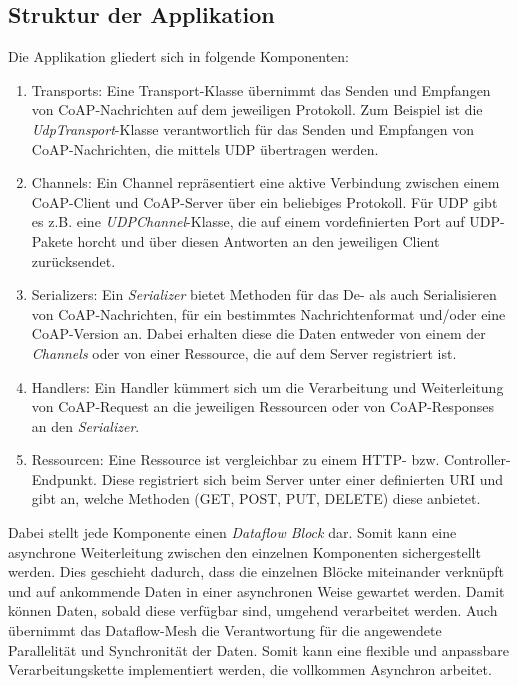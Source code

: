 \subsection{Struktur der Applikation}
\label{subsec:struktur-der-applikation}

Die Applikation gliedert sich in folgende Komponenten:
\begin{enumerate}
    \item Transports: Eine Transport-Klasse übernimmt das Senden und Empfangen von CoAP-Nachrichten auf dem jeweiligen Protokoll. Zum Beispiel ist die \textit{UdpTransport}-Klasse verantwortlich für das Senden und Empfangen von CoAP-Nachrichten, die mittels UDP übertragen werden.
    \item Channels: Ein Channel repräsentiert eine aktive Verbindung zwischen einem CoAP-Client und CoAP-Server über ein beliebiges Protokoll. Für UDP gibt es z.B. eine \textit{UDPChannel}-Klasse, die auf einem vordefinierten Port auf UDP-Pakete horcht und über diesen Antworten an den jeweiligen Client zurücksendet.
    \item Serializers: Ein \textit{Serializer} bietet Methoden für das De- als auch Serialisieren von CoAP-Nachrichten, für ein bestimmtes Nachrichtenformat und/oder eine CoAP-Version an. Dabei erhalten diese die Daten entweder von einem der \textit{Channels} oder von einer Ressource, die auf dem Server registriert ist.
    \item Handlers: Ein Handler kümmert sich um die Verarbeitung und Weiterleitung von CoAP-Request an die jeweiligen Ressourcen oder von CoAP-Responses an den \textit{Serializer}.
    \item Ressourcen: Eine Ressource ist vergleichbar zu einem HTTP- bzw. Controller-Endpunkt. Diese registriert sich beim Server unter einer definierten URI und gibt an, welche Methoden (GET, POST, PUT, DELETE) diese anbietet.
\end{enumerate}

Dabei stellt jede Komponente einen \textit{Dataflow Block} dar. Somit kann eine asynchrone Weiterleitung zwischen den einzelnen Komponenten sichergestellt werden. Dies geschieht dadurch, dass die einzelnen Blöcke miteinander verknüpft und auf ankommende Daten in einer asynchronen Weise gewartet werden. Damit können Daten, sobald diese verfügbar sind, umgehend verarbeitet werden. Auch übernimmt das Dataflow-Mesh die Verantwortung für die angewendete Parallelität und Synchronität der Daten. Somit kann eine flexible und anpassbare Verarbeitungskette implementiert werden, die vollkommen Asynchron arbeitet.


